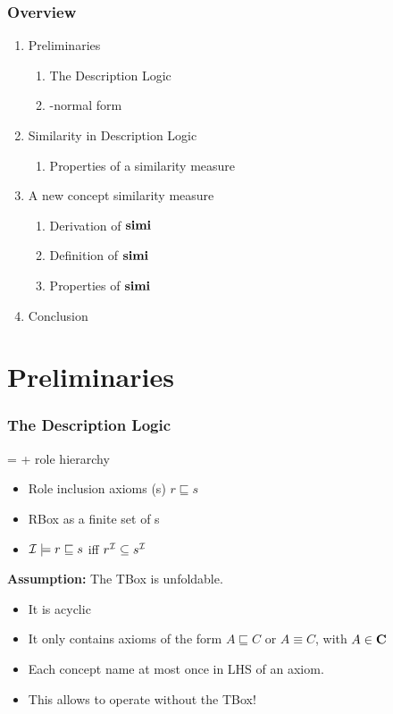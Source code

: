 \documentclass{beamer}
\begin{document}
\begin{frame}
  \frametitle{Overview}
  \begin{enumerate}
    \item Preliminaries
    \begin{enumerate}
      \item The \elh Description Logic
      \item \elh-normal form
    \end{enumerate}
    \item Similarity in Description Logic
    \begin{enumerate}
      \item Properties of a similarity measure
    \end{enumerate}
    \item A new concept similarity measure
    \begin{enumerate}
      \item Derivation of \(\operatorname{\mathbf{simi}}\)
      \item Definition of \(\operatorname{\mathbf{simi}}\)
      \item Properties of \(\operatorname{\mathbf{simi}}\)
    \end{enumerate}
    \item Conclusion
  \end{enumerate}
\end{frame}

\section{Preliminaries}

\begin{frame}
  \frametitle{The \elh{} Description Logic}
  \elh = \el + \alert{role hierarchy}
  \begin{itemize}[<+->]
    \item \alert{Role inclusion axioms} (\ria{}s) \(r \sqsubseteq s\)
    \item \alert{RBox} as a finite set of \ria{}s
    \item \(\mathcal{I} \models r \sqsubseteq s\) iff \(r^{\mathcal{I}} \subseteq s^{\mathcal{I}}\)
  \end{itemize}
  \textbf{Assumption:} The TBox is \alert{unfoldable}.
  \begin{itemize}[<+->]
    \item It is acyclic
    \item It only contains axioms of the form
    \(A \sqsubseteq C\) or \(A \equiv C\), with \(A \in \mathbf{C}\)
    \item Each concept name at most once in LHS of an axiom.
    \item This allows to operate without the TBox!
  \end{itemize}
\end{frame}
\end{document}
